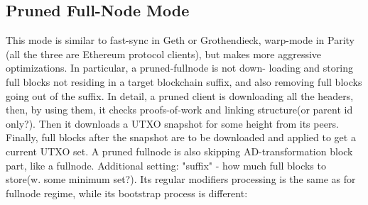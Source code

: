 \documentclass[]{article}   %
\begin{document}
\subsection{Pruned Full-Node Mode}
This mode is similar to fast-sync in Geth or Grothendieck, warp-mode in Parity (all the three are Ethereum protocol clients), but makes more aggressive optimizations. In particular, a pruned-fullnode is not down- loading and storing full blocks not residing in a target blockchain suffix, and also removing full blocks going out of the suffix.
In detail, a pruned client is downloading all the headers, then, by using them, it checks proofs-of-work and linking structure(or parent id only?). Then it downloads a UTXO snapshot for some height from its peers. Finally, full blocks after the snapshot are to be downloaded and applied to get a current UTXO set.
A pruned fullnode is also skipping AD-transformation block part, like a fullnode. Additional setting: "suffix" - how much full blocks to store(w. some minimum set?).
Its regular modifiers processing is the same as for fullnode regime, while its bootstrap process is different:
\end{document}
